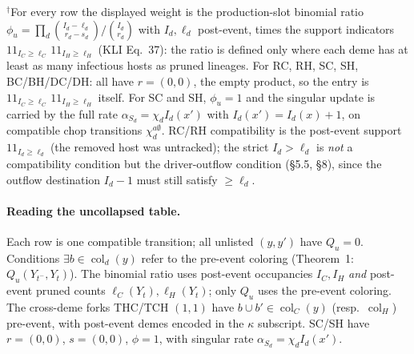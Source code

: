 \documentclass[11pt]{article}
\newcommand{\col}{\operatorname{col}}
\newcommand{\ind}{1\!\!1}
\newcommand{\Supp}{\ind_{I_C\ge\ell_C}\,\ind_{I_H\ge\ell_H}}
\theoremstyle{plain}
\begin{document}
$^\dagger$For every row the displayed weight is the production-slot binomial ratio
$\phi_u=\prod_d\binom{I_d-\ell_d}{r_d-s_d}/\binom{I_d}{r_d}$ with $I_d,\ell_d$ post-event, times the
support indicators $\Supp$ (KLI Eq.~37): the ratio is defined only where each deme has at least as
many infectious hosts as pruned lineages. For RC, RH,
SC, SH, BC/BH/DC/DH: all have $r=(0,0)$, the empty product, so the entry is $\Supp$ itself. For SC
and SH, $\phi_u=1$ and the singular update is carried by the full rate
$\alpha_{S_d}=\chi_d I_d(x')$ with $I_d(x')=I_d(x)+1$, on compatible chop transitions
$\chi^{a\emptyset}_d$. RC/RH
compatibility is the post-event support $\ind_{I_d\ge\ell_d}$ (the removed host was untracked); the
strict $I_d>\ell_d$ is \emph{not} a compatibility condition but the driver-outflow condition (\S5.5,
\S8), since the outflow destination $I_d-1$ must still satisfy $\ge\ell_d$.

\paragraph{Reading the uncollapsed table.} Each row is one compatible transition; all unlisted
$(y,y')$ have $Q_u=0$. Conditions $\exists b\in\col_d(y)$ refer to the pre-event coloring
(Theorem~1: $Q_u(Y_{t^-},Y_t)$). The binomial ratio uses post-event occupancies $I_C,I_H$
\emph{and} post-event pruned counts $\ell_C(Y_t),\ell_H(Y_t)$; only $Q_u$ uses the pre-event
coloring. The cross-deme forks THC/TCH $(1,1)$ have $b\cup b'\in\col_C(y)$ (resp.\ $\col_H$)
pre-event, with post-event demes encoded in the $\kappa$ subscript. SC/SH have $r=(0,0)$,
$s=(0,0)$, $\phi=1$, with singular rate $\alpha_{S_d}=\chi_d I_d(x')$.
\end{document}
